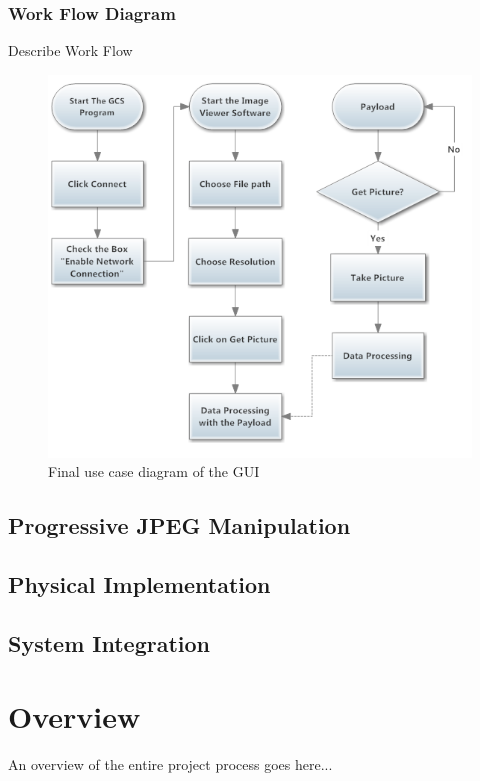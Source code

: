 \documentclass[oneside]{ecsgdp}         %
\begin{document}
\subsection{Work Flow Diagram}
Describe Work Flow
\begin{center}
\begin{figure}[!hbtp]
\includegraphics[scale=1]{finalWorkFlow.PNG} 
\caption{Final use case diagram of the GUI\label{GUI_finalWorkFlow}}
\end{figure}
\end{center}
\section{Progressive JPEG Manipulation}

\section{Physical Implementation}

\section{System Integration}


\chapter{Overview}
An overview of the entire project process goes here...
\end{document}
